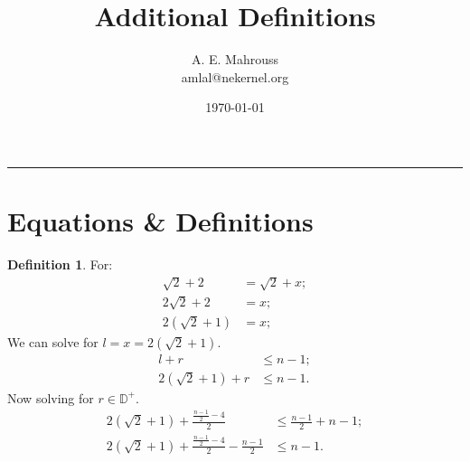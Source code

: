 \documentclass[10pt]{article}
\title{%
	\vspace{-1.5em}%
	\large\textbf{Additional Definitions}%
}
\author{A. E. Mahrouss\\amlal@nekernel.org}
\date{\today}
\theoremstyle{plain}
\theoremstyle{definition}
\newtheorem{definition}[theorem]{Definition}
\theoremstyle{remark}
\begin{document}
	
\maketitle
\vspace{-0.5em}
\vspace{0.8em}
\rule{\linewidth}{0.4pt}
\vspace{1em}
	
	\section{Equations \& Definitions}
	
	\begin{definition}
		For:
		\begin{align*}
			\sqrt{2}+2&=\sqrt{2} + x;\\
			2\sqrt{2}+2 &=x;\\
			2(\sqrt{2} + 1) &= x;
		\end{align*}
		We can solve for $l=x=2(\sqrt{2} + 1).$
		\begin{align*}
			l + r &\leq n - 1;\\
			2(\sqrt{2} + 1) + r &\leq n - 1.
		\end{align*}
		Now solving for $r \in \mathbb{D}^{+}.$
		\begin{align*}
			2(\sqrt{2} + 1) + \frac{\frac{n - 1}{2} - 4}{2}  &\leq \frac{n - 1}{2} + n - 1;\\
			2(\sqrt{2} + 1) + \frac{\frac{n - 1}{2} - 4}{2} - \frac{n - 1}{2} &\leq n - 1.
		\end{align*}
	\end{definition}
	
	\nocite{*}
	
	
	
	
\end{document}
